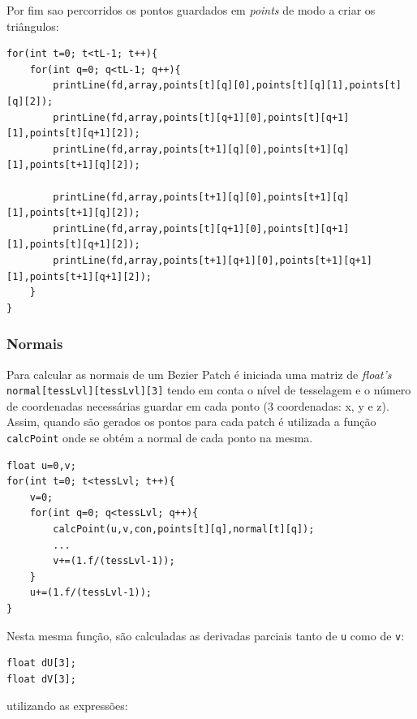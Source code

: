 \documentclass{article}
\begin{document}
Por fim sao percorridos os pontos guardados em \textit{points} de modo a criar os triângulos:
\begin{verbatim}
for(int t=0; t<tL-1; t++){
    for(int q=0; q<tL-1; q++){
        printLine(fd,array,points[t][q][0],points[t][q][1],points[t][q][2]);
        printLine(fd,array,points[t][q+1][0],points[t][q+1][1],points[t][q+1][2]);
        printLine(fd,array,points[t+1][q][0],points[t+1][q][1],points[t+1][q][2]);

        printLine(fd,array,points[t+1][q][0],points[t+1][q][1],points[t+1][q][2]);
        printLine(fd,array,points[t][q+1][0],points[t][q+1][1],points[t][q+1][2]);
        printLine(fd,array,points[t+1][q+1][0],points[t+1][q+1][1],points[t+1][q+1][2]);
    }
}
\end{verbatim}

\subsubsection{Normais}
Para calcular as normais de um Bezier Patch é iniciada uma matriz de \textit{float's} \texttt{normal[tessLvl][tessLvl][3]} tendo em conta o nível de tesselagem e o número de coordenadas necessárias guardar em cada ponto (3 coordenadas: x, y e z).
Assim, quando são gerados os pontos para cada patch é utilizada a função \texttt{calcPoint} onde se obtém a normal de cada ponto na mesma.

\begin{verbatim}
float u=0,v;
for(int t=0; t<tessLvl; t++){
    v=0;
    for(int q=0; q<tessLvl; q++){
        calcPoint(u,v,con,points[t][q],normal[t][q]);
        ...
        v+=(1.f/(tessLvl-1));
    }
    u+=(1.f/(tessLvl-1));
}
\end{verbatim}

Nesta mesma função, são calculadas as derivadas parciais tanto de \texttt{u} como de \texttt{v}:

\begin{verbatim}
float dU[3];
float dV[3];
\end{verbatim}
utilizando as expressões:\\
\end{document}
